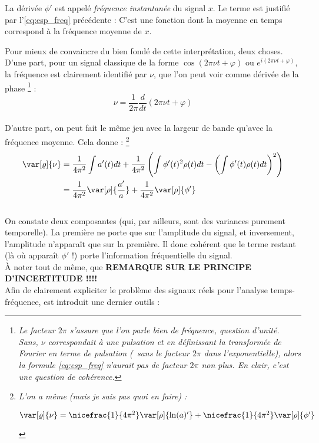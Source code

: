 \begin{definition}
	La dérivée $\phi'$ est appelé \emph{fréquence instantanée} du signal $x$. Le terme est justifié par l'\cref{eq:esp_freq} précédente : C'est une fonction dont la moyenne en temps correspond à la fréquence moyenne de $x$.
\end{definition}

Pour mieux de convaincre du bien fondé de cette interprétation, deux choses.
\\
D'une part, pour un signal classique de la forme $\cos(2\pi\nu t+\varphi)$ ou $e^{i(2\pi\nu t + \varphi)}$, la fréquence est clairement identifié par $\nu$, que l'on peut voir comme dérivée de la phase
	\footnote{\itshape 
			Le facteur $2\pi$ s'assure que l'on parle bien de fréquence, question d'unité. Sans, $\nu$ correspondait à une pulsation et en définissant la transformée de Fourier en terme de pulsation (\ie~sans le facteur $2\pi$ dans l'exponentielle), alors la formule \eqref{eq:esp_freq} n'aurait pas de facteur $2\pi$ non plus. En clair, c'est une question de cohérence.} :
\[\nu = \frac{1}{2\pi}\frac{d}{dt}(2\pi\nu t+\varphi)\]
\\
D'autre part, on peut fait le même jeu avec la largeur de bande qu'avec la fréquence moyenne. Cela donne :
	\footnote{\itshape 
		L'on a même (mais je sais pas quoi en faire) : 
		\begin{center}
			$\var[\varrho]{\nu} =  \nicefrac{1}{4\pi^2}\var[\rho]{\ln(a)'} + \nicefrac{1}{4\pi^2} \var[\rho]{\phi'}$
		\end{center}}
\begin{align*}
	\var[\varrho]{\nu} &= \frac{1}{4\pi^2} \int a'(t) dt + \frac{1}{4\pi^2}\left(\int \phi'(t)^2 \rho(t) dt - \left(\int \phi'(t) \rho(t) dt \right)^2 \right) \\
	&= \frac{1}{4\pi^2}\var[\rho]{\frac{a'}{a}} +\frac{1}{4\pi^2} \var[\rho]{\phi'}
\end{align*}
\\
On constate deux composantes (qui, par ailleurs, sont des variances purement temporelle). La première ne porte que sur l'amplitude du signal, et inversement, l'amplitude n'apparaît que sur la première. Il donc cohérent que le terme restant (là où apparaît $\phi'$ !) porte l'information fréquentielle du signal.
\\

\`A noter tout de même, que \textbf{REMARQUE SUR LE PRINCIPE D'INCERTITUDE !!!!}
\\

Afin de clairement expliciter le problème des signaux réels pour l'analyse temps-fréquence, est introduit une dernier outils :


